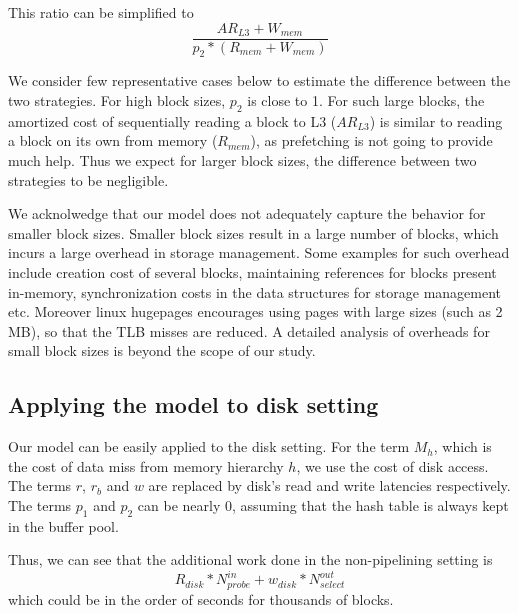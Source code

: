 This ratio can be simplified to 
\begin{equation*}
\frac{AR_{L3} + W_{mem} }{p_2 * (R_{mem} + W_{mem})}
\end{equation*}

We consider few representative cases below to estimate the difference between the two strategies.
For high block sizes, $p_2$ is close to 1. 
For such large blocks, the amortized cost of sequentially reading a block to L3 ($AR_{L3}$) is similar to reading a block on its own from memory ($R_{mem}$), as prefetching is not going to provide much help. 
Thus we expect for larger block sizes, the difference between two strategies to be negligible. 

We acknolwedge that our model does not adequately capture the behavior for smaller block sizes.
Smaller block sizes result in a large number of blocks, which incurs a large overhead in storage management.
Some examples for such overhead include creation cost of several blocks, maintaining references for blocks present in-memory, synchronization costs in the data structures for storage management etc.
Moreover linux hugepages encourages using pages with large sizes (such as 2 MB), so that the TLB misses are reduced.
A detailed analysis of overheads for small block sizes is beyond the scope of our study.

\subsection{Applying the model to disk setting}\label{ssec:model-disk}
Our model can be easily applied to the disk setting. 
For the term $M_h$, which is the cost of data miss from memory hierarchy $h$, we use the cost of disk access. 
The terms $r$, $r_b$ and $w$ are replaced by disk's read and write latencies respectively. 
The terms $p_1$ and $p_2$ can be nearly 0, assuming that the hash table is always kept in the buffer pool. 

Thus, we can see that the additional work done in the non-pipelining setting is 
\begin{equation*}
R_{disk} * N^{in}_{probe} +  w_{disk} * N^{out}_{select}
\end{equation*}
which could be in the order of seconds for thousands of blocks. 

